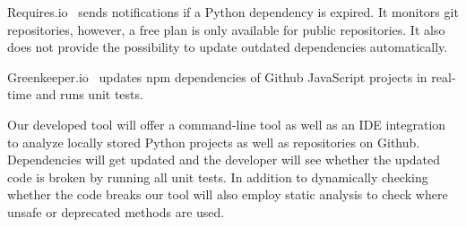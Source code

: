 \documentclass[sigconf]{acmart}
\begin{document}
Requires.io~\cite{requires} sends notifications if a Python dependency is expired. It monitors git repositories, however, a free plan is only available for public repositories. It also does not provide the possibility to update outdated dependencies automatically.

Greenkeeper.io~\cite{greenkeeper} updates npm dependencies of Github JavaScript projects in real-time and runs unit tests.

Our developed tool will offer a command-line tool as well as an IDE integration to analyze locally stored Python projects as well as repositories on Github. Dependencies will get updated and the developer will see whether the updated code is broken by running all unit tests. In addition to dynamically checking whether the code breaks our tool will also employ static analysis to check where unsafe or deprecated methods are used.






\end{document}

